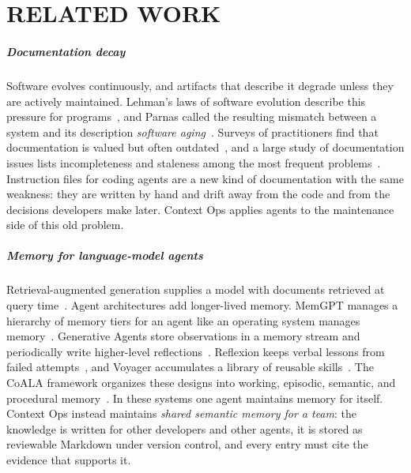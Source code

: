 \chapter{RELATED WORK}

\paragraph{Documentation decay} Software evolves continuously, and artifacts that describe it degrade unless they are actively maintained. Lehman's laws of software evolution describe this pressure for programs~\cite{lehman1980}, and Parnas called the resulting mismatch between a system and its description \emph{software aging}~\cite{parnas1994}. Surveys of practitioners find that documentation is valued but often outdated~\cite{forward2002}, and a large study of documentation issues lists incompleteness and staleness among the most frequent problems~\cite{aghajani2019}. Instruction files for coding agents are a new kind of documentation with the same weakness: they are written by hand and drift away from the code and from the decisions developers make later. Context Ops applies agents to the maintenance side of this old problem.

\paragraph{Memory for language-model agents} Retrieval-augmented generation supplies a model with documents retrieved at query time~\cite{lewis2020}. Agent architectures add longer-lived memory. MemGPT manages a hierarchy of memory tiers for an agent like an operating system manages memory~\cite{packer2023}. Generative Agents store observations in a memory stream and periodically write higher-level reflections~\cite{park2023}. Reflexion keeps verbal lessons from failed attempts~\cite{shinn2023}, and Voyager accumulates a library of reusable skills~\cite{wang2023voyager}. The CoALA framework organizes these designs into working, episodic, semantic, and procedural memory~\cite{sumers2024}. In these systems one agent maintains memory for itself. Context Ops instead maintains \emph{shared semantic memory for a team}: the knowledge is written for other developers and other agents, it is stored as reviewable Markdown under version control, and every entry must cite the evidence that supports it.

